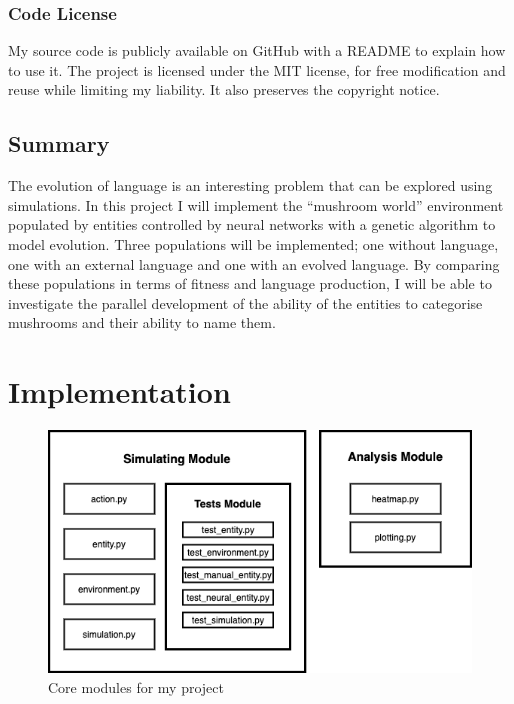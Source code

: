 \documentclass[12pt,a4paper,twoside,openright]{report}
\begin{document}
\subsection{Code License}

My source code is publicly available on GitHub with a README to explain how to use it. The project is licensed under the MIT license, for free modification and reuse while limiting my liability. It also preserves the copyright notice.

\section{Summary}\label{section:summary}

The evolution of language is an interesting problem that can be explored using simulations. In this project I will implement the ``mushroom world'' environment populated by entities controlled by neural networks with a genetic algorithm to model evolution. Three populations will be implemented; one without language, one with an external language and one with an evolved language. By comparing these populations in terms of fitness and language production, I will be able to investigate the parallel development of the ability of the entities to categorise mushrooms and their ability to name them.


\chapter{Implementation}

\begin{figure}[t]
  \centering
  \includegraphics[width=.8\linewidth]{figs/modules}
  \caption{Core modules for my project}
  \label{fig:modules}
\end{figure}
\end{document}
